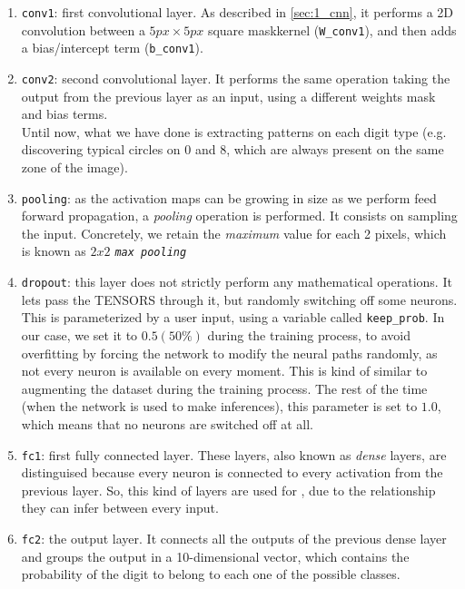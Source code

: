 		\begin{enumerate}
			\item \texttt{conv1}: first convolutional layer. As described in \autoref{sec:1_cnn}, it performs a 2D convolution between a $5px \times 5px$ square mask\/kernel (\texttt{W\_conv1}), and then adds a bias/intercept term (\texttt{b\_conv1}).\\
			\item \texttt{conv2}: second convolutional layer. It performs the same operation taking the output from the previous layer as an input, using a different weights mask and bias terms.\\
			
			Until now, what we have done is extracting patterns on each digit type (e.g. discovering typical circles on $0$ and $8$, which are always present on the same zone of the image).\\
			\item \texttt{pooling}: as the activation maps can be growing in size as we perform feed forward propagation, a \emph{pooling} operation is performed. It consists on sampling the input. Concretely, we retain the \textit{maximum} value for each 2 pixels, which is known as \textit{$2x2$ \texttt{max pooling}}
			
			\item \texttt{dropout}: this layer does not strictly perform any mathematical operations. It lets pass the TENSORS through it, but randomly switching off some neurons. This is parameterized by a user input, using a variable called \texttt{keep\_prob}. In our case, we set it to $0.5 (50\%)$ during the training process, to avoid overfitting by forcing the network to modify the neural paths randomly, as not every neuron is available on every moment. This is kind of similar to augmenting the dataset during the training process. The rest of the time (when the network is used to make inferences), this parameter is set to $1.0$, which means that no neurons are switched off at all.\\
			\item \texttt{fc1}: first fully connected layer. These layers, also known as \emph{dense} layers, are distinguised because every neuron is connected to every activation from the previous layer. So, this kind of layers are used for , due to the relationship they can infer between every input.\\
			\item \texttt{fc2}: the output layer. It connects all the outputs of the previous dense layer and groups the output in a 10-dimensional vector, which contains the probability of the digit to belong to each one of the possible classes.
		\end{enumerate}


